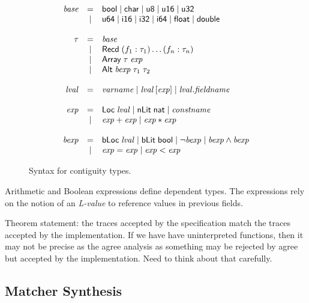 \begin{figure}
\[
\begin{array}{rcl}
 \mathit{base} & = & \mathsf{bool} \mid \mathsf{char} \mid \mathsf{u8} \mid \mathsf{u16} \mid \mathsf{u32} \\
               & \mid & \mathsf{u64}  \mid \mathsf{i16} \mid \mathsf{i32} \mid \mathsf{i64} \mid \mathsf{float} \mid \mathsf{double} \\ \\

 \tau & = & \mathit{base} \\
      & \mid & \mathsf{Recd}\; (f_1 : \tau_1) \ldots (f_n : \tau_n) \\
      & \mid & \mathsf{Array}\; \tau \; \mathit{exp} \\
      & \mid & \mathsf{Alt}\; \mathit{bexp}\; \tau_1 \; \tau_2 \\ \\

\mathit{lval} & = & \mathit{varname} \mid
                    \mathit{lval} \, [ \mathit{exp} ] \mid
                    \mathit{lval} . \mathit{fieldname} \\ \\

\mathit{exp} & = & \mathsf{Loc}\; \mathit{lval}
              \mid \mathsf{nLit}\; \mathsf{nat}
              \mid \mathit{constname} \\
             & \mid & \mathit{exp} + \mathit{exp}
                   \mid \mathit{exp} * \mathit{exp} \\ \\

\mathit{bexp} & = & \mathsf{bLoc}\; \mathit{lval}
              \mid  \mathsf{bLit}\; \mathsf{bool}
              \mid  \neg \mathit{bexp}
              \mid  \mathit{bexp} \land \mathit{bexp} \\
              & \mid & \mathit{exp} = \mathit{exp} 
              \mid  \mathit{exp} < \mathit{exp}
\end{array}
\]
\caption{Syntax for contiguity types.}
\label{contig-types}
\end{figure}

Arithmetic and Boolean expressions define dependent types. The expressions rely on the notion of an \emph{L-value} to reference values in previous fields.

Theorem statement: the traces accepted by the specification match the traces accepted by the implementation. If we have have uninterpreted functions, then it may not be precise as the agree analysis as something may be rejected by agree but accepted by the implementation. Need to think about that carefully.

\subsection{Matcher Synthesis}